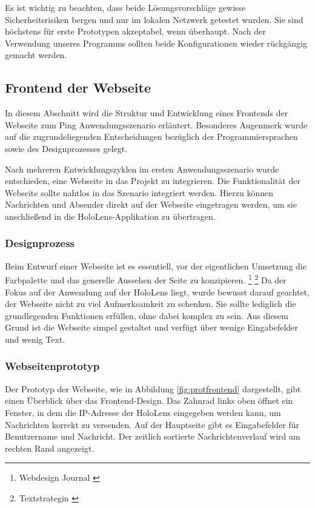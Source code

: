 Es ist wichtig zu beachten, dass beide Lösungsvorschläge gewisse Sicherheitsrisiken bergen und nur im lokalen Netzwerk getestet wurden. Sie sind höchstens für erste Prototypen akzeptabel, wenn überhaupt. Nach der Verwendung unseres Programms sollten beide Konfigurationen wieder rückgängig gemacht werden.

\subsection{\label{sec:FrontendWebseite}Frontend der Webseite}
In diesem Abschnitt wird die Struktur und Entwicklung eines Frontends der Webseite zum Ping Anwendungsszenario erläutert. Besonderes Augenmerk wurde auf die zugrundeliegenden Entscheidungen bezüglich der Programmiersprachen sowie des Designprozesses gelegt.

Nach mehreren Entwicklungszyklen im ersten Anwendungsszenario wurde entschieden, eine Webseite in das Projekt zu integrieren. Die Funktionalität der Webseite sollte nahtlos in das Szenario integriert werden. Hierzu können Nachrichten und Absender direkt auf der Webseite eingetragen werden, um sie anschließend in die HoloLens-Applikation zu übertragen.

\subsubsection{Designprozess}
Beim Entwurf einer Webseite ist es essentiell, vor der eigentlichen Umsetzung die Farbpalette und das generelle Aussehen der Seite zu konzipieren. \footnote{Webdesign Journal \cite{Website Konzept}} \footnote{Textstrategin \cite{Aufbau einer Website Inhalte und Struktur richtig Planen und Erstellen}} Da der Fokus auf der Anwendung auf der HoloLens liegt, wurde bewusst darauf geachtet, der Webseite nicht zu viel Aufmerksamkeit zu schenken. Sie sollte lediglich die grundlegenden Funktionen erfüllen, ohne dabei komplex zu sein. Aus diesem Grund ist die Webseite simpel gestaltet und verfügt über wenige Eingabefelder und wenig Text.

\subsubsection*{Webseitenprototyp}
Der Prototyp der Webseite, wie in Abbildung \ref{fig:protfrontend} dargestellt, gibt einen Überblick über das Frontend-Design. Das Zahnrad links oben öffnet ein Fenster, in dem die IP-Adresse der HoloLens eingegeben werden kann, um Nachrichten korrekt zu versenden. Auf der Hauptseite gibt es Eingabefelder für Benutzername und Nachricht. Der zeitlich sortierte Nachrichtenverlauf wird am rechten Rand angezeigt.

